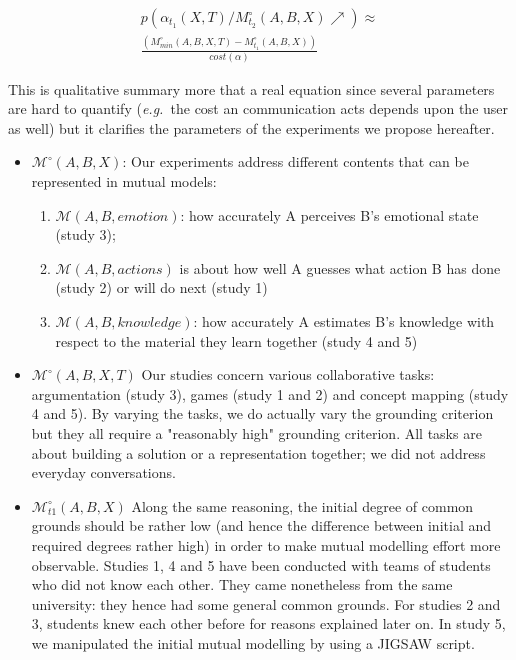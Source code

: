 \documentclass[twocolumn]{article}
\newcommand{\eg}{{\textit{e.g.\ }}}
\newcommand{\model}[3]{{$\mathcal{M}(#1, #2, #3)$}}
\newcommand{\Model}[3]{{$\mathcal{M}^{\circ}(#1, #2, #3)$}}
\begin{document}
\begin{multline} \label{eq:probrepair}
p(\alpha_{t_1}(X,T) / M^{\circ}_{t_2}(A,B,X) \nearrow) \approx \\
\frac{(M^{\circ}_{min}(A,B,X,T) - M^{\circ}_{t_1}(A,B,X))}{cost (\alpha)}
\end{multline}

This is qualitative summary more that a real equation since several parameters
are hard to quantify (\eg the cost an communication acts depends upon the user
as well) but it clarifies the parameters of the experiments we propose hereafter.

\begin{itemize}
    \item \Model{A}{B}{X}: Our experiments address different contents that can be
        represented in mutual models:

    \begin{enumerate}
        \item \model{A}{B}{emotion}: how accurately A perceives B's emotional state
            (study 3); 

        \item \model{A}{B}{actions} is about how well A guesses what action B has
            done (study 2) or will do next  (study 1)

        \item \model{A}{B}{knowledge}: how accurately A estimates B's knowledge
            with respect to the material they learn together (study 4 and 5)

    \end{enumerate}



    \item \Model{A,B}{X}{T} Our studies concern various collaborative tasks:
        argumentation (study 3), games (study 1 and 2) and concept mapping
        (study 4 and 5). By varying the tasks, we do actually vary the grounding
        criterion but they all require a "reasonably high" grounding criterion.
        All tasks are about building a solution or a representation together; we
        did not address everyday conversations. 

    \item $\mathcal{M}^{\circ}_{t1}(A,B,X)$ Along the same reasoning, the initial degree
        of common grounds should be rather low (and hence the difference between
        initial and required degrees rather high) in order to make mutual
        modelling effort more observable. Studies 1, 4 and 5 have been conducted
        with teams of students who did not know each other. They came
        nonetheless from the same university: they hence had some general common
        grounds.  For studies 2 and 3, students knew each other before for
        reasons explained later on. In study 5, we manipulated the initial mutual modelling by
        using a JIGSAW script.


\end{itemize}
\end{document}
